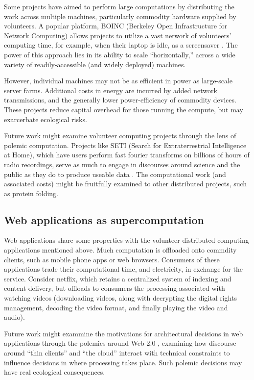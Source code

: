 \documentclass[sigconf]{acmart}
\begin{document}
Some projects have aimed to perform large computations by distributing the work across multiple machines,
particularly commodity hardware supplied by volunteers.
A popular platform, BOINC (Berkeley Open Infrastructure for Network Computing)
allows projects to utilize a vast network of volunteers' computing time, 
for example, when their laptop is idle, as a screensaver
\cite{Anderson2004}.
The power of this approach lies in its ability to scale ``horizontally,''
across a wide variety of readily-accessible (and widely deployed) machines.

However, individual machines may not be as efficient in power 
as large-scale server farms.
Additional costs in energy are incurred by added network transmissions,
and the generally lower power-efficiency of commodity devices.
These projects reduce capital overhead for those running the compute,
but may exarcerbate ecological risks.

Future work might examine volunteer computing projects through the lens of polemic computation.
Projects like SETI (Search for Extraterrestrial Intelligence at Home), which have users perform fast fourier transforms on billions of hours of radio recordings,
serve as much to engage in discourses around science and the public as they do to produce useable data 
\cite{Anderson2004}.
The computational work (and associated costs) might be fruitfully examined to other distributed projects, 
such as protein folding.

\subsection{Web applications as supercomputation}
\label{sec:orga08f9a8}

Web applications share some properties with the volunteer distributed computing applications mentioned above.
Much computation is offloaded onto commdity clients, such as mobile phone apps or web browsers.
Consumers of these applications trade their computational time, and electricity, in exchange for the service.
Consider netflix, which retains a centralized system of indexing and content delivery,
but offloads to consumers the processing associated with watching videos 
(downloading videos, along with decrypting the digital rights management, decoding the video format, and finally playing the video and audio).

Future work might exammine the motivations for architectural decisions in web applications through 
the polemics around Web 2.0 
\cite{Scholz2008},
examining how discourse around ``thin clients'' and ``the cloud''
interact with technical constraints
to influence decisions in where processing takes place.
Such polemic decisions may have real ecological consequences.
\end{document}
